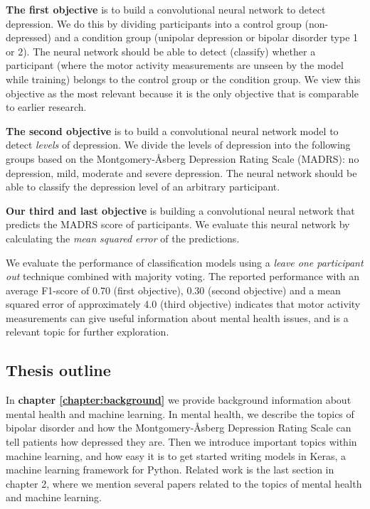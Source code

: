 \textbf{The first objective} is to build a convolutional neural network to detect depression. We do this by dividing participants into a control group (non-depressed) and a condition group (unipolar depression or bipolar disorder type 1 or 2). The neural network should be able to detect (classify) whether a participant (where the motor activity measurements are unseen by the model while training) belongs to the control group or the condition group. We view this objective as the most relevant because it is the only objective that is comparable to earlier research.

\textbf{The second objective} is to build a convolutional neural network model to detect \textit{levels} of depression. We divide the levels of depression into the following groups based on the Montgomery-Åsberg Depression Rating Scale (MADRS): no depression, mild, moderate and severe depression. The neural network should be able to classify the depression level of an arbitrary participant.

\textbf{Our third and last objective} is building a convolutional neural network that predicts the MADRS score of participants. We evaluate this neural network by calculating the \textit{mean squared error} of the predictions.

We evaluate the performance of classification models using a \textit{leave one participant out} technique combined with majority voting. The reported performance with an average F1-score of 0.70 (first objective), 0.30 (second objective) and a mean squared error of approximately 4.0 (third objective) indicates that motor activity measurements can give useful information about mental health issues, and is a relevant topic for further exploration.

\subsection{Thesis outline}
In \textbf{chapter \ref{chapter:background}} we provide background information about mental health and machine learning. In mental health, we describe the topics of bipolar disorder and how the Montgomery-Åsberg Depression Rating Scale can tell patients how depressed they are. Then we introduce important topics within machine learning, and how easy it is to get started writing models in Keras, a machine learning framework for Python. Related work is the last section in chapter 2, where we mention several papers related to the topics of mental health and machine learning. \\

